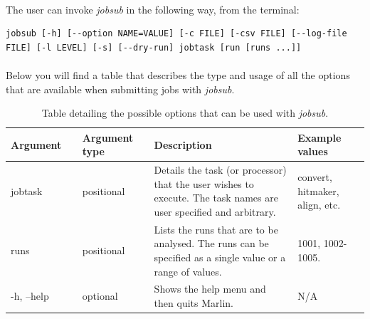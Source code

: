 \documentclass[11pt]{article}
\begin{document}
\paragraph{}
The user can invoke \textit{jobsub} in the following way, from the terminal:
\begin{verbatim}
jobsub [-h] [--option NAME=VALUE] [-c FILE] [-csv FILE] [--log-file FILE] [-l LEVEL] [-s] [--dry-run] jobtask [run [runs ...]]
\end{verbatim}
\paragraph{}
Below you will find a table that describes the type and usage of all the options that are available when submitting jobs with \textit{jobsub}.
\pagebreak
\begin{table}[!ht]
\centering
\caption{Table detailing the possible options that can be used with \textit{jobsub}.}
\label{jobsub_options}
\begin{tabular}{|p{0.2\linewidth}|p{0.2\linewidth}|p{0.4\linewidth}|p{0.2\linewidth}|}
\hline 
\textbf{Argument}                        & \textbf{Argument type} & \textbf{Description}                                                                                                                                                                                                                                       & \textbf{Example values}        \\ \hline
jobtask                                  & positional             & Details the task (or processor) that the user wishes to execute. The task names are user specified and arbitrary.                                                                                                                                          & convert, hitmaker, align, etc. \\ \hline
runs                                     & positional             & Lists the runs that are to be analysed. The runs can be specified as a single value or a range of values.                                                                                                                                                  & 1001, 1002-1005.               \\ \hline
-h, --help                               & optional               & Shows the help menu and then quits Marlin.                                                                                                                                                                                                                 & N/A                            \\ \hline

\end{tabular}
\end{table}
\end{document}
